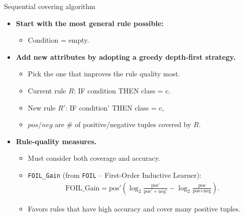 \documentclass[aspectratio=169,t,table]{beamer}
\begin{document}
  {
    \begin{frame}{Sequential covering algorithm}
      \begin{itemize}
        \item \textbf{Start with the most general rule possible:}
        \begin{itemize}
          \item Condition = empty.
        \end{itemize}
        \item \textbf{Add new attributes by adopting a greedy depth-first strategy.}
        \begin{itemize}
          \item Pick the one that improves the rule quality most.
          \item Current rule $R$: IF condition THEN class = c.
          \item New rule $R'$: IF condition' THEN class = c,
          \item $pos/neg$ are $\#$ of positive/negative tuples covered by $R$.
        \end{itemize}
        \item \textbf{Rule-quality measures.}
        \begin{itemize}
          \item Must consider both coverage and accuracy.
          \item \texttt{FOIL\_Gain} (from \texttt{FOIL} – First-Order Inductive Learner):
          \begin{align}
            \text{FOIL\_Gain} = \text{pos}' \left( \log_2 \frac{\text{pos}'}{\text{pos}' + \text{neg}'} - \log_2 \frac{\text{pos}}{\text{pos}+\text{neg}} \right).
          \end{align}
          \item Favors rules that have high accuracy and cover many positive tuples.
        \end{itemize}
      \end{itemize}
    \end{frame}
  }
\end{document}
